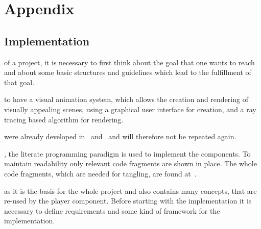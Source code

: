 \documentclass[%
    a4paper,    %
    justified,  %
    nobib,      %
    openany     %
]{tufte-book}
\begin{document}


\backmatter{}


\appendix
\part*{Appendix}


\chapter{Implementation}
\label{appendix:chap:implementation}

 of a project, it is necessary to
first think about the goal that one wants to reach and about some basic
structures and guidelines which lead to the fulfillment of that goal.

 to have a visual animation system, which allows
the creation and rendering of visually appealing scenes, using a graphical user
interface for creation, and a ray tracing based algorithm for
rendering.~

 were already developed
in~ and~ and will
therefore not be repeated again.

, the literate programming
paradigm is used to implement the components. To maintain readability only
relevant code fragments are shown in place. The whole code fragments, which are
needed for tangling, are found at~.

 as it is the basis for the
whole project and also contains many concepts, that are re-used by the player
component. Before starting with the implementation it is necessary to define
requirements and some kind of framework for the implementation.

\end{document}
